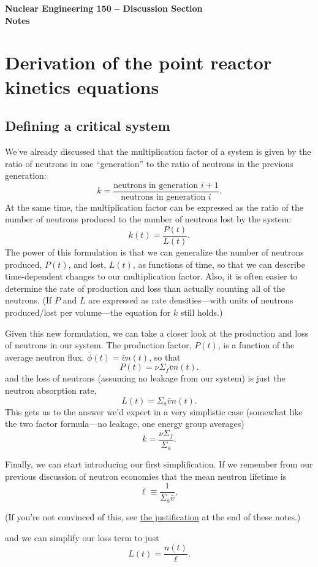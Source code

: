 \documentclass{report}
\begin{document}
\begin{center}
\textbf{\large Nuclear Engineering 150 -- Discussion Section}\\ 
\textbf{Notes}
\end{center}




\section*{Derivation of the point reactor kinetics equations} 

\subsection*{Defining a critical system}
We've already discussed that the multiplication factor of a system is given by the ratio of neutrons in one ``generation'' to the ratio of neutrons in the previous generation:
$$ k = \frac{\text{neutrons in generation }i + 1}{\text{neutrons in generation }i}.$$
At the same time, the multiplication factor can be expressed as the ratio of the number of neutrons produced to the number of neutrons lost by the system:
$$ k(t) = \frac{P(t)}{L(t)}.$$
The power of this formulation is that we can generalize the number of neutrons produced, $P(t)$, and lost, $L(t)$, as functions of time, so that we can describe time-dependent changes to our multiplication factor. Also, it is often easier to determine the rate of production and loss than actually counting all of the neutrons. (If $P$ and $L$ are expressed as rate densities---with units of neutrons produced/lost per volume---the equation for $k$ still holds.)

Given this new formulation, we can take a closer look at the production and loss of neutrons in our system. The production factor, $P(t)$, is a function of the average neutron flux, $\bar{\phi}(t) = \bar{v}n(t)$, so that 
$$ P(t) = \nu \Sigma_f \bar{v} n(t) .$$
and the loss of neutrons (assuming no leakage from our system) is just the neutron absorption rate, 
$$L(t) = \Sigma_a \bar{v}n(t) .$$
This gets us to the answer we'd expect in a very simplistic case (somewhat like the two factor formula---no leakage, one energy group averages)
$$ k = \frac{\nu \Sigma_f}{\Sigma_a} .$$

Finally, we can start introducing our first simplification. If we remember from our previous discussion of neutron economies that the mean neutron lifetime is 
$$ \ell \equiv \frac{1}{\Sigma_a \bar{v}}, $$
\begin{center}(If you're not convinced of this, see \hyperref[meanlifetime]{the justification} at the end of these notes.)\end{center}
and we can simplify our loss term to just 
$$L(t) = \frac{n(t)}{\ell} .$$
\end{document}

